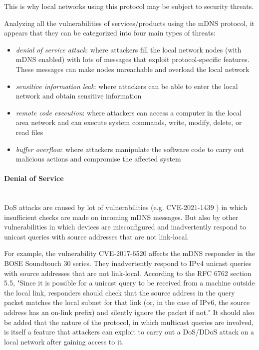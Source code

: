 \documentclass[fleqn, 11pt]{SelfArx} %
\begin{document}
This is why local networks using this protocol may be subject to security threats. 

Analyzing all the vulnerabilities of services/products using the mDNS protocol, it appears that they can be categorized into four main types of threats:
\begin{itemize}[leftmargin=*]
	\item {\it{denial of service attack}}: where attackers fill the local network nodes (with mDNS enabled) with lots of messages that exploit protocol-specific features. These messages can make nodes unreachable and overload the local network
	\item {\it{sensitive information leak}}: where attackers can be able to enter the local network and obtain sensitive information
	\item {\it{remote code execution}}: where attackers can access a computer in the local area network and can execute system commands, write, modify, delete, or read files
	\item {\it{buffer overflow}}: where attackers manipulate the software code to carry out malicious actions and compromise the affected system 
\end{itemize}

\paragraph{Denial of Service}\mbox{}\\
DoS attacks are caused by lot of vulnerabilities (e.g. CVE-2021-1439 \cite{CVE-2021-1439}) in which insufficient checks are made on incoming mDNS messages.
But also by other vulnerabilities in which devices are misconfigured and inadvertently respond to unicast queries with source addresses that are not link-local. 

For example, the vulnerability CVE-2017-6520 \cite{CVE-2017-6520} affects the mDNS responder in the BOSE Soundtouch 30 series. They inadvertently respond to IPv4 unicast queries with source addresses that are not link-local. According to the RFC 6762\cite{rfc6762} section 5.5, "Since it is possible for a unicast query to be received from a machine outside the local link, responders should check that the source address in the query packet matches the local subnet for that link (or, in the case of IPv6, the source address has an on-link prefix) and silently ignore the packet if not." \newline\newline
It should also be added that the nature of the protocol, in which multicast queries are involved, is itself a feature that attackers can exploit to carry out a DoS/DDoS attack on a local network after gaining access to it.
\end{document}

